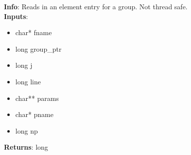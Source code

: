 \textbf{Info}: Reads in an element entry for a group. Not thread safe.\\

\noindent \textbf{Inputs}:
\begin{itemize}
\item{char* fname}
\item{long group\_ptr}
\item{long j}
\item{long line}
\item{char** params}
\item{char* pname}
\item{long np}
\end{itemize}

\noindent \textbf{Returns}: long
